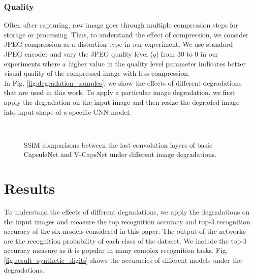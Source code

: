 \documentclass[10pt, journal, compsoc]{IEEEtran}
\begin{document}
\subsubsection{Quality}
Often after capturing, raw image goes through multiple compression steps for storage or processing. Thus, to understand the effect of compression, we consider JPEG compression as a distortion type in our experiment. We use standard JPEG encoder and vary the JPEG quality level ($q$) from 30 to 0 in our experiments where a higher value in the quality level parameter indicates better visual quality of the compressed image with less compression.\\
In Fig. \ref{fig:degradation_samples}, we show the effects of different degradations that are used in this work. To apply a particular image degradation, we first apply the degradation on the input image and then resize the degraded image into input shape of a specific CNN model.
\begin{figure*}
\captionsetup[subfigure]{labelformat=empty}
 \vspace{-3mm}\\
\caption{SSIM comparisons between the last convolution layers of basic CapsuleNet and V-CapsNet under different image degradations.}
\label{fig:result_ssim}
\end{figure*}

\section{Results}\label{results}
To understand the effects of different degradations, we apply the degradations on the input images and measure the top recognition accuracy and top-3 recognition accuracy of the six models considered in this paper. The output of the networks are the recognition probability of each class of the dataset. We include the top-3 accuracy measure as it is popular in many complex recognition tasks. Fig. \ref{fig:result_synthetic_digits} shows the accuracies of different models under the degradations.
\end{document}

